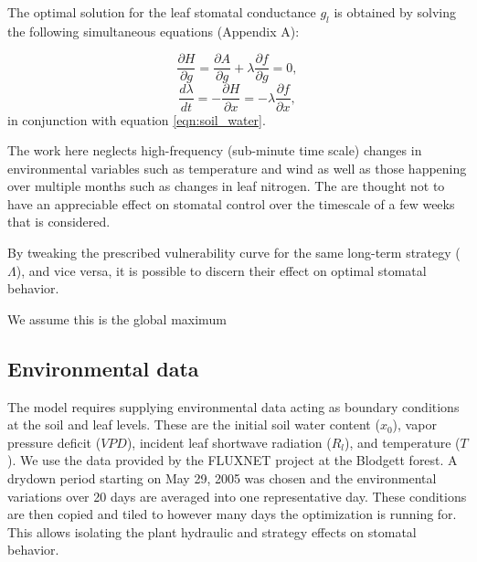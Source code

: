 \documentclass[utf8]{frontiersSCNS} %
\begin{document}
The optimal solution for the leaf stomatal conductance $g_l$ is obtained by solving the following simultaneous equations (Appendix A):

\begin{equation}
    \label{eqn: dg}
    \frac{\partial H}{\partial g} = \frac{\partial A}{\partial g} + \lambda \frac{\partial f}{\partial g}=0,
\end{equation}
\begin{equation}
    \label{eqn: dlam}
    \frac{d\lambda}{dt} = - \frac{\partial H}{\partial x} = - \lambda \frac{\partial f}{\partial x},
\end{equation}
in conjunction with equation \ref{eqn:soil_water}.

The work here neglects high-frequency (sub-minute time scale) changes in environmental variables such as temperature and wind as well as those happening over multiple months such as changes in leaf nitrogen. The are thought not to have an appreciable effect on stomatal control over the timescale of a few weeks that is considered.

By tweaking the prescribed vulnerability curve for the same long-term strategy ($\Lambda$), and vice versa, it is possible to discern their effect on optimal stomatal behavior. 

We assume this is the global maximum

\subsection{Environmental data} 

The model requires supplying environmental data acting as boundary conditions at the soil and leaf levels. These are the initial soil water content ($x_0$), vapor pressure deficit ($VPD$), incident leaf shortwave radiation ($R_l$), and temperature ($T$). We use the data provided by the FLUXNET project at the Blodgett forest. A drydown period starting on May 29, 2005 was chosen and the environmental variations over 20 days are averaged into one representative day. These conditions are then copied and tiled to however many days the optimization is running for. This allows isolating the plant hydraulic and strategy effects on stomatal behavior.
\end{document}
